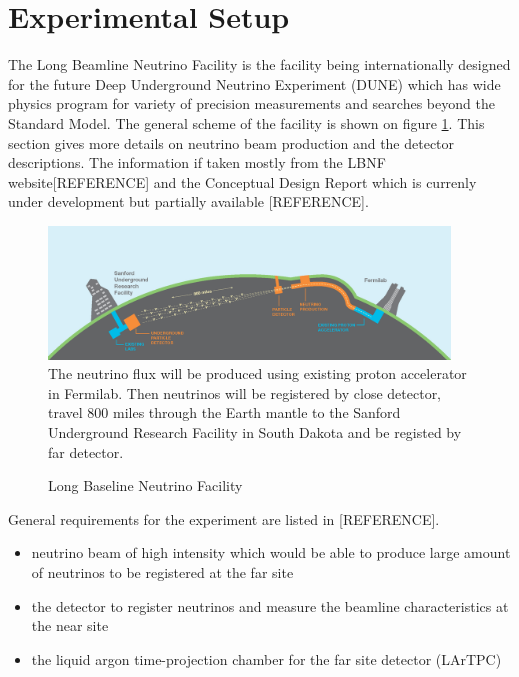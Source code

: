 \section{Experimental Setup}

The Long Beamline Neutrino Facility is the facility being internationally designed for the future Deep Underground Neutrino Experiment (DUNE) which has wide physics program for variety of precision measurements and searches beyond the Standard Model. The general scheme of the facility is shown on figure \ref{fig:LBNF_overallScheme}. This section gives more details on neutrino beam production and the detector descriptions. The information if taken mostly from the LBNF website[REFERENCE] and the Conceptual Design Report which is currenly under development but partially available [REFERENCE].

\begin{figure}
\caption{Long Baseline Neutrino Facility}
\label{fig:LBNF_overallScheme}
\centering
\includegraphics[width=0.95\textwidth, keepaspectratio=true]{figs/LBNF_overallScheme.png}
\\The neutrino flux will be produced using existing proton accelerator in Fermilab. Then neutrinos will be registered by close detector, travel 800 miles through the Earth mantle to the Sanford Underground Research Facility in South Dakota and be registed by far detector. \cite{ref_LBNFweb}   
\end{figure}

General requirements for the experiment are listed in [REFERENCE].
\begin{itemize}
  \item neutrino beam of high intensity which would be able to produce large amount of neutrinos to be registered at the far site
  \item the detector to register neutrinos and measure the beamline characteristics at the near site
  \item the liquid argon time-projection chamber for the far site detector (LArTPC)
\end{itemize}

